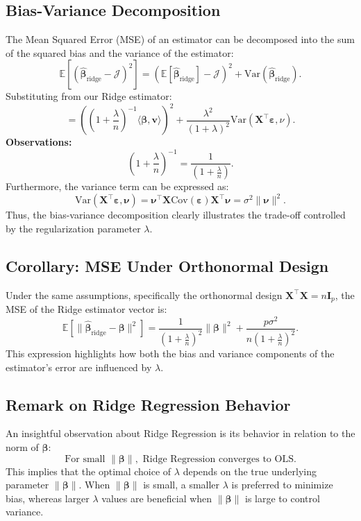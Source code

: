 \documentclass[open=any, 11pt,paper=A4]{scrreprt}
\begin{document}
\subsection*{Bias-Variance Decomposition}

The Mean Squared Error (MSE) of an estimator can be decomposed into the sum of the squared bias and the variance of the estimator:
\[
\mathbb{E}\left[(\hat{\bm{\beta}}_{\text{ridge}} - \mathcal{J})^2\right] = (\mathbb{E}[\hat{\bm{\beta}}_{\text{ridge}}] - \mathcal{J})^2 + \text{Var}(\hat{\bm{\beta}}_{\text{ridge}}).
\]
Substituting from our Ridge estimator:
\[
= \left((1 + \frac{\lambda}{n})^{-1} \langle \bm{\beta}, \bm{v} \rangle\right)^2 + \frac{\lambda^2}{(1 + \lambda)^2} \text{Var}(\bm{X}^\top \bm{\varepsilon}, \nu).
\]
\textbf{Observations:}
\[
(1 + \frac{\lambda}{n})^{-1} = \frac{1}{(1 + \frac{\lambda}{n})}.
\]
Furthermore, the variance term can be expressed as:
\[
\text{Var}(\bm{X}^\top \bm{\varepsilon}, \bm{\nu}) = \bm{\nu}^\top \bm{X} \text{Cov}(\bm{\varepsilon}) \bm{X}^\top \bm{\nu} = \sigma^2 \|\bm{\nu}\|^2.
\]
Thus, the bias-variance decomposition clearly illustrates the trade-off controlled by the regularization parameter \(\lambda\).

\subsection*{Corollary: MSE Under Orthonormal Design}

Under the same assumptions, specifically the orthonormal design \(\bm{X}^\top \bm{X} = n \bm{I}_p\), the MSE of the Ridge estimator vector is:
\[
\mathbb{E}[\|\hat{\bm{\beta}}_{\text{ridge}} - \bm{\beta}\|^2] = \frac{1}{(1 + \frac{\lambda}{n})^2} \|\bm{\beta}\|^2 + \frac{p \sigma^2}{n (1 + \frac{\lambda}{n})^2}.
\]
This expression highlights how both the bias and variance components of the estimator's error are influenced by \(\lambda\).

\subsection*{Remark on Ridge Regression Behavior}

An insightful observation about Ridge Regression is its behavior in relation to the norm of \(\bm{\beta}\):
\[
\text{For small } \|\bm{\beta}\|, \text{ Ridge Regression converges to OLS.}
\]
This implies that the optimal choice of \(\lambda\) depends on the true underlying parameter \(\|\bm{\beta}\|\). When \(\|\bm{\beta}\|\) is small, a smaller \(\lambda\) is preferred to minimize bias, whereas larger \(\lambda\) values are beneficial when \(\|\bm{\beta}\|\) is large to control variance.
\end{document}
